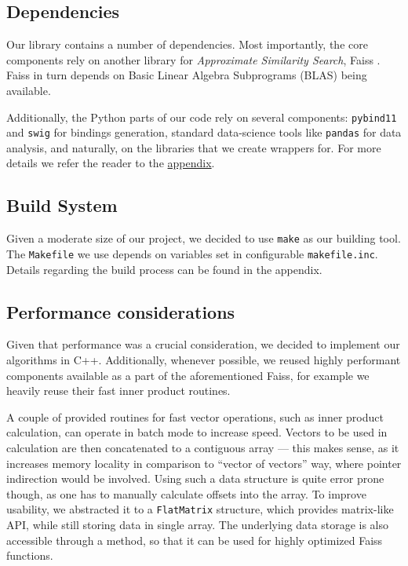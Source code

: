 
\subsection{Dependencies}

Our library contains a number of dependencies. Most importantly, the core components rely on 
another library for \textit{Approximate Similarity Search}, Faiss \cite{faiss}.
Faiss in turn depends on Basic Linear Algebra Subprograms (BLAS) being available.

Additionally, the Python parts of our code rely on several components: \texttt{pybind11} and \texttt{swig}
for bindings generation, standard data-science tools like \texttt{pandas} for data analysis, and naturally, on the
libraries that we create wrappers for. For more details we refer the reader to the \hyperref[sec:appendices]{appendix}.

\subsection{Build System}

Given a moderate size of our project, we decided to use \texttt{make} as our building tool. The \texttt{Makefile} we use
depends on variables set in configurable \texttt{makefile.inc}. Details regarding the build process can be found in the appendix.

\subsection{Performance considerations}

Given that performance was a crucial consideration, we decided to implement our algorithms in C++.
Additionally, whenever possible, we reused highly performant components available as a part of the aforementioned Faiss,
for example we heavily reuse their fast inner product routines. 

A couple of provided routines for fast vector operations, such as inner product calculation, can
operate in batch mode to increase speed. Vectors to be used in calculation are then concatenated
to a contiguous array --- this makes sense, as it increases memory locality in comparison
to ``vector of vectors'' way, where pointer indirection would be involved. Using such a data structure
is quite error prone though, as one has to manually calculate offsets into the array. To improve
usability, we abstracted it to a \texttt{FlatMatrix} structure, which provides matrix-like API, while
still storing data in single array. The underlying data storage is also accessible through a method,
so that it can be used for highly optimized Faiss functions.

